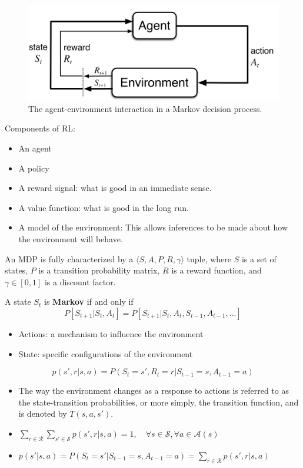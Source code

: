 \begin{figure}[h]
	\centering
	\includegraphics[scale=0.3]{./images/mdp.png}
	\caption{The agent-environment interaction in a Markov decision process.}
	\label{fig:mdp_ill}
\end{figure}

Components of RL:
\begin{itemize}
	\item An agent
	\item A policy
	\item A reward signal: what is good in an immediate sense.
	\item A value function: what is good in the long run.
	\item A model of the environment: This allows inferences to be made about how the environment will behave.
\end{itemize}
An MDP is fully characterized by a $\langle S,A,P,R,\gamma \rangle$ tuple, where $S$ is a set of states, $P$ is a transition probability matrix, $R$ is a reward function, and $\gamma\in[0,1]$  is a discount factor.

\begin{definition}
	A state $S_t$ is \textbf{Markov} if and only if 
	$$P[S_{t+1}|S_t, A_t] = P[S_{t+1}|S_t, A_t, S_{t-1},A_{t-1},...]$$
\end{definition}
\begin{itemize}
	\item Actions: a mechanism to influence the environment
	\item State: specific configurations of the environment
\end{itemize}

\begin{definition}
	$$p(s',r|s,a) = P(S_t=s',R_t=r|S_{t-1}=s,A_{t-1}=a)$$
\end{definition}
\begin{itemize}
	\item The way the environment changes as a response to actions is referred to as the state-transition probabilities, or more simply, the transition function, and is denoted by $T(s,a,s')$.
	\item $\sum_{r\in \mathcal{R}}\sum_{s'\in \mathcal{S}}p(s',r|s,a) = 1, \quad \forall s \in \mathcal{S}, \forall a\in \mathcal{A}(s)$
	\item $p(s'|s,a)=P(S_t=s'|S_{t-1}=s,A_{t-1}=a)=\sum_{r\in \mathcal{R}}p(s',r|s,a)$
\end{itemize}

